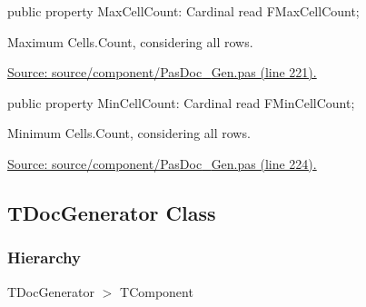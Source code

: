 \documentclass{report}
\newif\ifpdf
\begin{document}
\begin{list}{}{
\setlength{\itemindent}{0cm}
\setlength{\listparindent}{0cm}
\setlength{\leftmargin}{\evensidemargin}
\addtolength{\leftmargin}{\tmplength}
\settowidth{\labelsep}{X}
\addtolength{\leftmargin}{\labelsep}
\setlength{\labelwidth}{\tmplength}
}
\label{PasDoc_Gen.TTableData-MaxCellCount}
\item[\textbf{MaxCellCount}\hfill]
\ifpdf
\begin{flushleft}
\fi
\begin{ttfamily}
public property MaxCellCount: Cardinal read FMaxCellCount;\end{ttfamily}

\ifpdf
\end{flushleft}
\fi


\par Maximum Cells.Count, considering all rows.\par
\href{https://github.com/pasdoc/pasdoc/blob/master/source/component/PasDoc_Gen.pas#L221}{Source: source/component/PasDoc{\_}Gen.pas (line 221).}\label{PasDoc_Gen.TTableData-MinCellCount}
\item[\textbf{MinCellCount}\hfill]
\ifpdf
\begin{flushleft}
\fi
\begin{ttfamily}
public property MinCellCount: Cardinal read FMinCellCount;\end{ttfamily}

\ifpdf
\end{flushleft}
\fi


\par Minimum Cells.Count, considering all rows.\par
\href{https://github.com/pasdoc/pasdoc/blob/master/source/component/PasDoc_Gen.pas#L224}{Source: source/component/PasDoc{\_}Gen.pas (line 224).}\end{list}
\ifpdf
\subsection*{\large{\textbf{TDocGenerator Class}}\normalsize\hspace{1ex}\hrulefill}
\else
\subsection*{TDocGenerator Class}
\fi
\label{PasDoc_Gen.TDocGenerator}
\subsubsection*{\large{\textbf{Hierarchy}}\normalsize\hspace{1ex}\hfill}
TDocGenerator {$>$} TComponent
\end{document}
